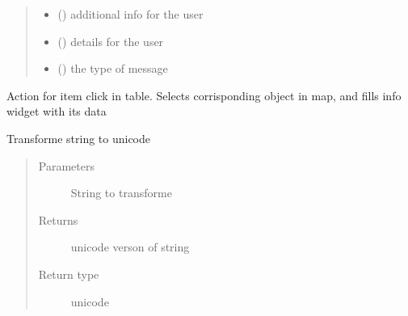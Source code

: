 \documentclass[letterpaper,10pt,english]{sphinxmanual}
\begin{document}
\begin{fulllineitems}
\begin{fulllineitems}
\begin{quote}
\begin{description}
\begin{itemize}
\item {} 
 () \textendash{} additional info for the user

\item {} 
 () \textendash{} details for the user

\item {} 
 () \textendash{} the type of message

\end{itemize}

\end{description}\end{quote}

\end{fulllineitems}


\begin{fulllineitems}
\label{\detokenize{code:Tilgjengelighet.Tilgjengelighet.table_item_clicked}}
Action for item click in table. Selects corrisponding object in map, and fills info widget with its data

\end{fulllineitems}


\begin{fulllineitems}
\label{\detokenize{code:Tilgjengelighet.Tilgjengelighet.to_unicode}}
Transforme string to unicode
\begin{quote}\begin{description}
\item[{Parameters}] \leavevmode
{} \textendash{} String to transforme

\item[{Returns}] \leavevmode
unicode verson of string

\item[{Return type}] \leavevmode
unicode

\end{description}\end{quote}


\end{fulllineitems}
\end{fulllineitems}
\end{document}
